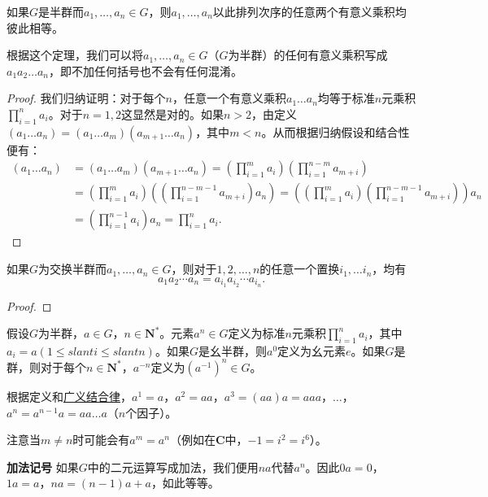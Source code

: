 \documentclass[../../main.tex]{subfiles}
\begin{document}
\begin{theorem}[广义结合律]\label{theorem:广义结合律}
如果$G$是半群而$a_1, \dots, a_n \in G$，则$a_1, \dots, a_n$以此排列次序的任意两个有意义乘积均彼此相等。
\end{theorem}
\begin{remark}
根据这个定理，我们可以将$a_1, \dots, a_n \in G$（$G$为半群）的任何有意义乘积写成$a_1 a_2 \dots a_n$，即不加任何括号也不会有任何混淆。
\end{remark}
\begin{proof}
我们归纳证明：对于每个$n$，任意一个有意义乘积$a_1 \dots a_n$均等于标准$n$元乘积$\prod_{i = 1}^n a_i$。对于$n = 1, 2$这显然是对的。如果$n > 2$，由定义$(a_1 \dots a_n) = (a_1 \dots a_m)(a_{m + 1} \dots a_n)$，其中$m < n$。从而根据归纳假设和结合性便有：
\begin{align*}
(a_1 \dots a_n) &= (a_1 \dots a_m)(a_{m + 1} \dots a_n) = \left( \prod_{i = 1}^m a_i \right) \left( \prod_{i = 1}^{n - m} a_{m + i} \right) \\
&= \left( \prod_{i = 1}^m a_i \right) \left( \left( \prod_{i = 1}^{n - m - 1} a_{m + i} \right) a_n \right) = \left( \left( \prod_{i = 1}^m a_i \right) \left( \prod_{i = 1}^{n - m - 1} a_{m + i} \right) \right) a_n \\
&= \left( \prod_{i = 1}^{n - 1} a_i \right) a_n = \prod_{i = 1}^n a_i.
\end{align*}
\end{proof}

\begin{theorem}[广义交换律]\label{theorem:广义交换律}
如果$G$为交换半群而$a_1, \dots, a_n \in G$，则对于$1, 2, \dots, n$的任意一个置换$i_1, \dots i_n$，均有
\[a_{1}a_{2}\cdots a_{n} = a_{i_1}a_{i_2}\cdots a_{i_n}.\]
\end{theorem}
\begin{proof}

\end{proof}

\begin{definition}[方幂]
假设$G$为半群，$a \in G$，$n \in \boldsymbol{N}^*$。元素$a^n \in G$定义为标准$n$元乘积$\prod_{i = 1}^n a_i$，其中$a_i = a(1 \leqslant slant i \leqslant slant n)$。如果$G$是幺半群，则$a^0$定义为幺元素$e$。如果$G$是群，则对于每个$n \in \boldsymbol{N}^*$，$a^{-n}$定义为$(a^{-1})^n \in G$。
\end{definition}
\begin{remark}
根据定义和\hyperref[theorem:广义结合律]{广义结合律}，$a^1 = a$，$a^2 = aa$，$a^3 = (aa)a = aaa$，$\dots$，$a^n = a^{n - 1}a = aa \dots a$（$n$个因子）。

注意当$m \neq n$时可能会有$a^m = a^n$（例如在$\boldsymbol{C}$中，$-1 = i^2 = i^6$）。

\textbf{加法记号}$\,\,$如果$G$中的二元运算写成加法，我们便用$na$代替$a^n$。因此$0a = 0$，$1a = a$，$na = (n - 1)a + a$，如此等等。
\end{remark}
\end{document}
